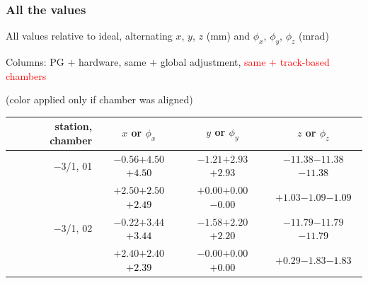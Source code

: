 \documentclass[compress]{beamer}
\begin{document}
\begin{frame}
\frametitle{All the values}
\tiny

All values relative to ideal, alternating $x$, $y$, $z$ (mm) and $\phi_x$, $\phi_y$, $\phi_z$ (mrad)

Columns: PG $+$ hardware, same $+$ global adjustment, \textcolor{red}{same $+$ track-based chambers}

\hfill (color applied only if chamber was aligned)

\vfill
\renewcommand{\arraystretch}{1.1}
\begin{tabular}{r | c | c | c}
station, chamber & $x$ or $\phi_x$ & $y$ or $\phi_y$ & $z$ or $\phi_z$ \\\hline
$-$3/1, 01 & $-0.56$\hspace{0.1 cm}$+4.50$\hspace{0.1 cm}\textcolor{black}{$+4.50$} & $-1.21$\hspace{0.1 cm}$+2.93$\hspace{0.1 cm}\textcolor{black}{$+2.93$} & $-11.38$\hspace{0.1 cm}$-11.38$\hspace{0.1 cm}\textcolor{black}{$-11.38$} \\
           & $+2.50$\hspace{0.1 cm}$+2.50$\hspace{0.1 cm}\textcolor{black}{$+2.49$} & $+0.00$\hspace{0.1 cm}$+0.00$\hspace{0.1 cm}\textcolor{black}{$-0.00$} & $+1.03$\hspace{0.1 cm}$-1.09$\hspace{0.1 cm}\textcolor{black}{$-1.09$} \\
$-$3/1, 02 & $-0.22$\hspace{0.1 cm}$+3.44$\hspace{0.1 cm}\textcolor{black}{$+3.44$} & $-1.58$\hspace{0.1 cm}$+2.20$\hspace{0.1 cm}\textcolor{black}{$+2.20$} & $-11.79$\hspace{0.1 cm}$-11.79$\hspace{0.1 cm}\textcolor{black}{$-11.79$} \\
           & $+2.40$\hspace{0.1 cm}$+2.40$\hspace{0.1 cm}\textcolor{black}{$+2.39$} & $-0.00$\hspace{0.1 cm}$+0.00$\hspace{0.1 cm}\textcolor{black}{$+0.00$} & $+0.29$\hspace{0.1 cm}$-1.83$\hspace{0.1 cm}\textcolor{black}{$-1.83$} \\

\end{tabular}
\end{frame}
\end{document}
